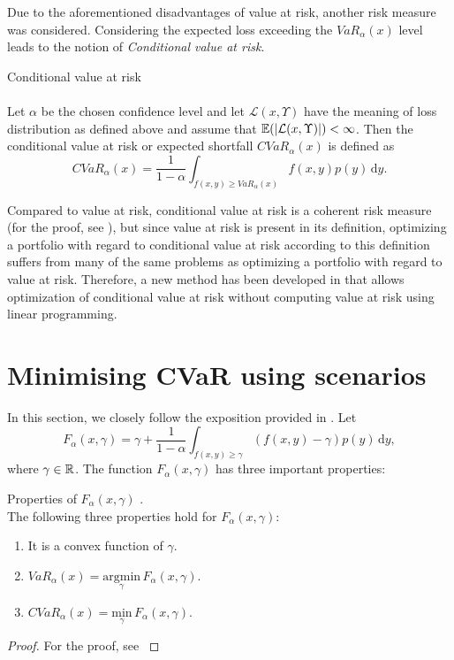 Due to the aforementioned disadvantages of value at risk, another risk measure was considered.
Considering the expected loss exceeding the $VaR_{\alpha}(x)$ level leads to the notion of \textit{Conditional value at risk}. 

\begin{defn}{Conditional value at risk} 
\label{cvar_definition}
\\  
\cite[p. 275]{cornuejols_tutuncu_2006}
\\
Let $\alpha$ be the chosen confidence level and let $\mathcal{L}(x,\Upsilon)$ have the meaning of loss distribution as defined above and assume that $\mathbb{E}(\left|{\mathcal{L}(x,\Upsilon)}\right|)<\infty$. Then the conditional value at risk or expected shortfall $CVaR_{\alpha}(x)$ is defined as
\begin{equation}
CVaR_{\alpha}(x)=\frac{1}{1-\alpha}\int_{f(x,y) \geq VaR_{\alpha}(x)} f(x,y)p(y) \, \mathrm{d} y.
\end{equation}
\end{defn}
Compared to value at risk, conditional value at risk is a coherent risk measure (for the proof, see \cite[Example 2.26.]{mcneil2015quantitative}), but since value at risk is present in its definition, optimizing a portfolio with regard to conditional value at risk according to this definition suffers from many of the same problems as optimizing a portfolio with regard to value at risk. Therefore, a new method has been developed in \cite{Rockafellar2000OptimizationOC} that allows optimization of conditional value at risk without computing value at risk using linear programming.

\section{Minimising CVaR using scenarios}
In this section, we closely follow the exposition provided in \cite[p. 275-278]{cornuejols_tutuncu_2006}.
Let
\begin{equation}
\label{eq:cvar_approx}
F_{\alpha}(x,\gamma)=\gamma + \frac{1}{1-\alpha} \int_{f(x,y) \geq \gamma} (f(x,y)-\gamma)p(y) \, \mathrm{d}y,
\end{equation}
where $\gamma \in \mathbb{R}$.
The function $F_{\alpha}(x,\gamma)$ has three important properties:
\begin{lemma}{Properties of $F_{\alpha}(x,\gamma)$ \cite[p. 276]{cornuejols_tutuncu_2006}.}
\label{lemma:properties_of_cvar_approx} 
\\
The following three properties hold for $F_{\alpha}(x,\gamma)$:
\begin{enumerate}
	\item It is a convex function of $\gamma$.
	\item $VaR_{\alpha}(x)=\underset{\gamma}{\mathrm{argmin}} \, F_{\alpha}(x,\gamma)$.
	\item $ CVaR_{\alpha}(x) = \underset{\gamma}{\mathrm{min}} \, F_{\alpha}(x,\gamma)$.
\end{enumerate}
\end{lemma}
\begin{proof}
For the proof, see \cite[Theorems 1 and 2]{Rockafellar2000OptimizationOC}
\end{proof}
